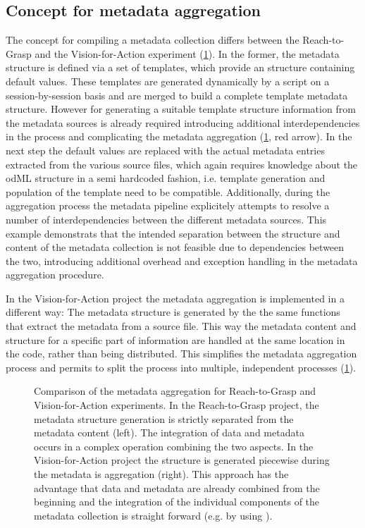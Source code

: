 \subsection{Concept for metadata aggregation}
\label{sec:disscussion_metadata_concept}
The concept for compiling a metadata collection differs between the Reach-to-Grasp and the Vision-for-Action experiment (\cref{fig:discussion_comparison_r2g_v4a}). In the former, the metadata structure is defined via a set of templates, which provide an  structure containing default values. These templates are generated dynamically by a script on a session-by-session basis and are merged to build a complete template metadata structure. However for generating a suitable template structure information from the metadata sources is already required introducing additional interdependencies in the process and complicating the metadata aggregation (\cref{fig:discussion_comparison_r2g_v4a}, red arrow). In the next step the default values are replaced with the actual metadata entries extracted from the various source files, which again requires knowledge about the odML structure in a semi hardcoded fashion, i.e. template generation and population of the template need to be compatible. Additionally, during the aggregation process the metadata pipeline explicitely attempts to resolve a number of interdependencies between the different metadata sources. This example demonstrats that the intended separation between the structure and content of the metadata collection is not feasible due to dependencies between the two, introducing additional overhead and exception handling in the metadata aggregation procedure.


In the Vision-for-Action project the metadata aggregation is implemented in a different way: The metadata structure is generated by the the same functions that extract the metadata from a source file. This way the metadata content and structure for a specific part of information are handled at the same location in the code, rather than being distributed. This simplifies the metadata aggregation process and permits to split the process into multiple, independent processes (\cref{fig:discussion_comparison_r2g_v4a}).

\begin{figure}
 \centering
 
 \caption[Comparison of the metadata aggregation for Reach-to-Grasp and Vision-for-Action experiments]{Comparison of the metadata aggregation for Reach-to-Grasp and Vision-for-Action experiments. In the Reach-to-Grasp project, the metadata structure generation is strictly separated from the metadata content (left). The integration of data and metadata occurs in a complex operation combining the two aspects. In the Vision-for-Action project the structure is generated  piecewise during the metadata is aggregation (right). This approach has the advantage that data and metadata are already combined from the beginning and the integration of the individual components of the metadata collection is straight forward (e.g. by using ).}
 \label{fig:discussion_comparison_r2g_v4a}
\end{figure}

